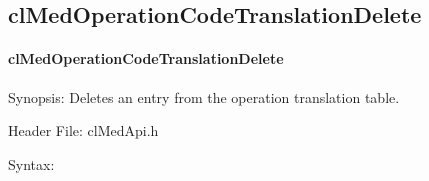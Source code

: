 \begin{flushleft}
\subsection{clMedOperationCodeTranslationDelete}
\hypertarget{pagemed107}{}\paragraph{cl\-Med\-Operation\-Code\-Translation\-Delete}\label{pagemed107}
\begin{Desc}
\item[Synopsis:]Deletes an entry from the operation translation table.\end{Desc}
\begin{Desc}
\item[Header File:]clMedApi.h\end{Desc}
\begin{Desc}
\item[Syntax:]


\end{Desc}
\end{flushleft}
